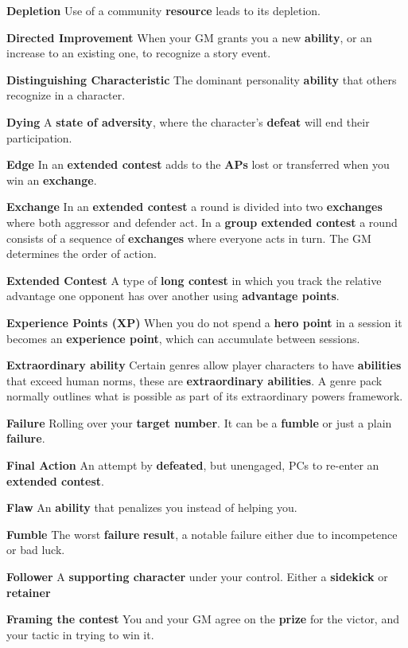 \documentclass[
]{article}
\begin{document}
\textbf{Depletion} Use of a community \textbf{resource} leads to its
depletion.

\textbf{Directed Improvement} When your GM grants you a new
\textbf{ability}, or an increase to an existing one, to recognize a
story event.

\textbf{Distinguishing Characteristic} The dominant personality
\textbf{ability} that others recognize in a character.

\textbf{Dying} A \textbf{state of adversity}, where the character's
\textbf{defeat} will end their participation.

\textbf{Edge} In an \textbf{extended contest} adds to the \textbf{APs}
lost or transferred when you win an \textbf{exchange}.

\textbf{Exchange} In an \textbf{extended contest} a round is divided
into two \textbf{exchanges} where both aggressor and defender act. In a
\textbf{group extended contest} a round consists of a sequence of
\textbf{exchanges} where everyone acts in turn. The GM determines the
order of action.

\textbf{Extended Contest} A type of \textbf{long contest} in which you
track the relative advantage one opponent has over another using
\textbf{advantage points}.

\textbf{Experience Points (XP)} When you do not spend a \textbf{hero
point} in a session it becomes an \textbf{experience point}, which can
accumulate between sessions.

\textbf{Extraordinary ability} Certain genres allow player characters to
have \textbf{abilities} that exceed human norms, these are
\textbf{extraordinary abilities}. A genre pack normally outlines what is
possible as part of its extraordinary powers framework.

\textbf{Failure} Rolling over your \textbf{target number}. It can be a
\textbf{fumble} or just a plain \textbf{failure}.

\textbf{Final Action} An attempt by \textbf{defeated}, but unengaged,
PCs to re-enter an \textbf{extended contest}.

\textbf{Flaw} An \textbf{ability} that penalizes you instead of helping
you.

\textbf{Fumble} The worst \textbf{failure} \textbf{result}, a notable
failure either due to incompetence or bad luck.

\textbf{Follower} A \textbf{supporting character} under your control.
Either a \textbf{sidekick} or \textbf{retainer}

\textbf{Framing the contest} You and your GM agree on the \textbf{prize}
for the victor, and your tactic in trying to win it.
\end{document}
